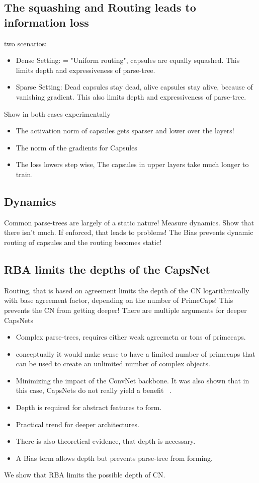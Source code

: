 \documentclass{article}
\begin{document}
\subsection*{The squashing and Routing leads to information loss}
two scenarios:
\begin{itemize}
	\item Dense Setting: = "Uniform routing", capsules are equally squashed. This limits depth and expressiveness of parse-tree.
	\item Sparse Setting: Dead capsules stay dead, alive capsules stay alive, because of vanishing gradient. This also limits depth and expressiveness of parse-tree.
\end{itemize}
Show in both cases experimentally
\begin{itemize}
	\item The activation norm of capsules gets sparser and lower over the layers!
	\item The norm of the gradients for Capsules
	\item The loss lowers step wise, The capsules in upper layers take much longer to train.
\end{itemize}

\subsection*{Dynamics}
Common parse-trees are largely of a static nature!
Measure dynamics.
Show that there isn't much. 
If enforced, that leads to problems!
The Bias prevents dynamic routing of capsules and the routing becomes static!

\subsection*{RBA limits the depths of the CapsNet}
 
Routing, that is based on agreement limits the depth of the CN logarithmically with base agreement factor, depending on the number of PrimeCaps!
This prevents the CN from getting deeper!
There are multiple arguments for deeper CapsNets
\begin{itemize}
	\item Complex parse-trees, requires either weak agreemetn or tons of primecaps.
	\item conceptually it would make sense to have a limited number of primecaps that can be used to create an unlimited number of complex objects.
	\item Minimizing the impact of the ConvNet backbone. It was also shown that in this case, CapsNets do not really yield a benefit ~\cite{acml/PaikKK19}.
	\item Depth is required for abstract features to form.
	\item Practical trend for deeper architectures.
	\item There is also theoretical evidence, that depth is necessary.
	\item A Bias term allows depth but prevents parse-tree from forming.
\end{itemize}
We show that RBA limits the possible depth of CN.
\end{document}
